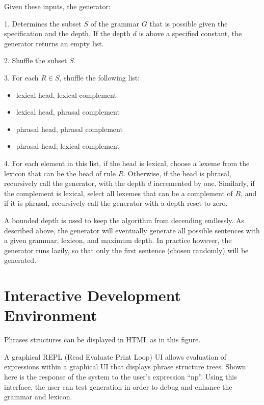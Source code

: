 \documentclass[11pt]{article}
\begin{document}
Given these inputs, the generator:

1. Determines the subset $S$ of the grammar $G$ that is possible given
the specification and the depth. If the depth $d$ is above a specified
constant, the generator returns an empty list.

2. Shuffle the subset $S$. 

3. For each $R \in S$, shuffle the following list:

\begin{itemize}
\item lexical head, lexical complement
\item lexical head, phrasal complement
\item phrasal head, phrasal complement
\item phrasal head, lexical complement
\end{itemize}

4. For each element in this list, if the head is lexical, choose a
lexeme from the lexicon that can be the head of rule $R$. Otherwise,
if the head is phrasal, recursively call the generator, with the depth
$d$ incremented by one. Similarly, if the complement is lexical,
select all lexemes that can be a complement of $R$, and if it is
phrasal, recursively call the generator with a depth reset to zero.

A bounded depth is used to keep the algorithm from decending
endlessly. As described above, the generator will eventually generate all
possible sentences with a given grammar, lexicon, and maximum
depth. In practice however, the generator runs lazily, so that only
the first sentence (chosen randomly) will be generated.

\section{Interactive Development Environment}

Phrases structures can be displayed in HTML as in this figure.

A graphical REPL (Read Evaluate Print Loop) UI allows evaluation of
expressions within a graphical UI that displays phrase structure
trees. Shown here is the response of the system to the user's expression ``np''.
Using this interface, the user can test generation in order to debug
and enhance the grammar and lexicon.
\end{document}
